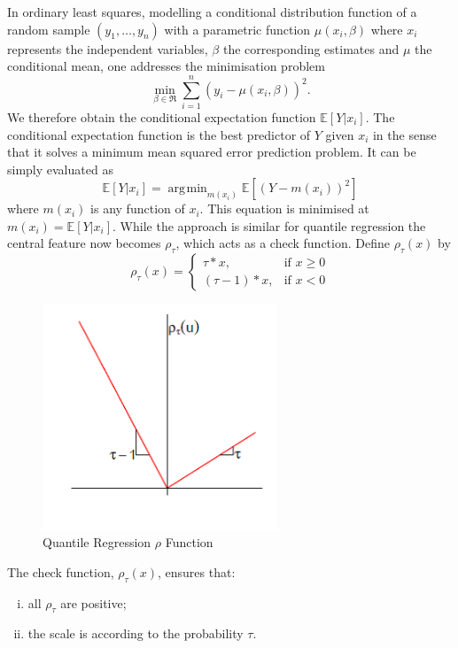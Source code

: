 \documentclass[12pt,a4paper]{report}
\DeclareMathOperator*{\argmin}{\arg\!\min}
\begin{document}
In ordinary least squares, modelling a conditional distribution function of a random sample $(y_{1},\ldots,y_{n})$ with a parametric function $\mu(x_{i},\beta)$ where $x_{i}$ represents the independent variables, $\beta$ the corresponding estimates and $\mu$ the conditional mean, one addresses the minimisation problem
    $$\min_{\beta\in\Re}\sum^{n}_{i=1}(y_{i}-\mu(x_{i},\beta))^{2}.$$
We therefore obtain the conditional expectation function $\mathbb{E}[Y|x_{i}]$. The conditional expectation function is the best predictor of $Y$ given $x_{i}$ in the sense that it solves a minimum mean squared error prediction problem. It can be simply evaluated as
$$ \mathbb{E}[Y|x_{i}]=\argmin_{m(x_{i})}\mathbb{E}[(Y-m(x_{i}))^2] $$
where $m(x_{i})$ is any function of $x_{i}$. This equation is minimised at $m(x_{i}) = \mathbb{E}[Y|x_{i}]$. While the approach is similar for quantile regression the central feature now becomes $\rho_{\tau}$, which acts as a check function. Define $\rho_{\tau}(x)$ by
    \[
        \rho_{\tau}(x)=
        \begin{cases}
        \tau*x,& \text{if } x\geq0\\
        (\tau-1)*x,& \text{if } x<0
        \end{cases}
    \]

\begin{figure}[ht]\centering
    \includegraphics[width=7cm]{CheckFunctionImage.png}
    \caption{Quantile Regression $\rho$ Function}
\end{figure}
\vspace{2mm}

The check function, $\rho_{\tau}(x)$, ensures that:
\begin{enumerate}[(i)]
    \item all $\rho_{\tau}$ are positive;
    \item the scale is according to the probability $\tau$.
\end{enumerate}
\end{document}
